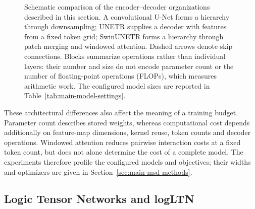 \documentclass[12pt,a4paper]{article}
\begin{document}
\begin{figure}[htbp]
\caption{Schematic comparison of the encoder--decoder organizations
described in this section. A convolutional U-Net forms a hierarchy through
downsampling; UNETR supplies a decoder with features from a fixed token
grid; SwinUNETR forms a hierarchy through patch merging and windowed
attention. Dashed arrows denote skip connections. Blocks summarize
operations rather than individual layers: their number and size do not
encode parameter count or the number of floating-point operations
(FLOPs), which measures arithmetic work. The configured model sizes are reported
in Table~\ref{tab:main-model-settings}.}
\label{fig:architecture-families}
\end{figure}

These architectural differences also affect the meaning of a training
budget. Parameter count describes stored weights, whereas computational
cost depends additionally on feature-map dimensions, kernel reuse, token
counts and decoder operations. Windowed attention reduces pairwise
interaction costs at a fixed token count, but does not alone determine
the cost of a complete model. The experiments therefore profile the
configured models and objectives; their widths and optimizers are given
in Section~\ref{sec:main-msd-methods}.

\subsection{Logic Tensor Networks and logLTN}\label{sec:ltn-background}
\end{document}
